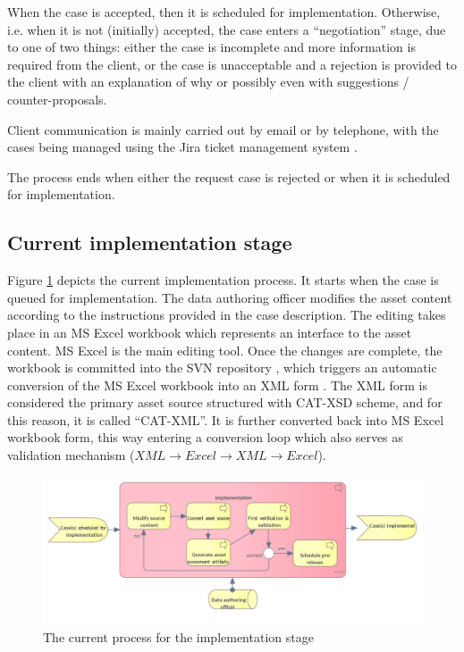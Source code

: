 	
	When the case is accepted, then it is scheduled for implementation. Otherwise, i.e. when it is not (initially) accepted, the case enters a ``negotiation'' stage, due to one of two things: either the case is incomplete and more information is required from the client, or the case is unacceptable and a rejection is provided to the client with an explanation of why or possibly even with suggestions / counter-proposals. 
	
	Client communication is mainly carried out by email or by telephone, with the cases being managed using the Jira ticket management system \citep{jira}. 
	
	The process ends when either the request case is rejected or when it is scheduled for implementation. 

	
	\subsection{Current implementation stage}
	\label{sec:implementation-current}
		
	Figure \ref{fig:implementation-current} depicts the current implementation process. It starts when the case is queued for implementation. The data authoring officer modifies the asset content according to the instructions provided in the case description. The editing takes place in an MS Excel \citep{excel} workbook which represents an interface to the asset content. MS Excel is the main editing tool. Once the changes are complete, the workbook is committed into the SVN repository \citep{svn}, which triggers an automatic conversion of the MS Excel workbook into an XML form \cite{xml11-spec}. The XML form is considered the primary asset source structured with CAT-XSD scheme, and for this reason, it is called ``CAT-XML''. It is further converted back into MS Excel workbook form, this way entering a conversion loop which also serves as validation mechanism ($XML \rightarrow Excel \rightarrow XML \rightarrow Excel$).
	
	\begin{figure}[h]
		\centering
		\includegraphics[width=.9\textwidth]{images/business/current/Implementation.png}
		\caption{The current process for the implementation stage}
		\label{fig:implementation-current}
	\end{figure}
	

